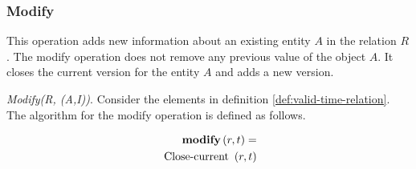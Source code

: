 %
\subsubsection{\label{subsubsec:modify}Modify}
This operation adds new information about an existing entity $A$ in the relation $R$. The modify operation does not remove any previous value of the object $A$. It closes the current version for the entity $A$ and adds a new version.



\begin{definition}
 \emph{Modify(R, (A,I))}.
Consider the elements in definition \ref{def:valid-time-relation}. The algorithm for the modify operation is defined as follows.
\end{definition}


\begin{align}
\label{eq:modify}
\MOD \left( r, t\right) =\\
\nonumber
\mbox{ Close-current }\left(r, t\right) %
\end{align}



